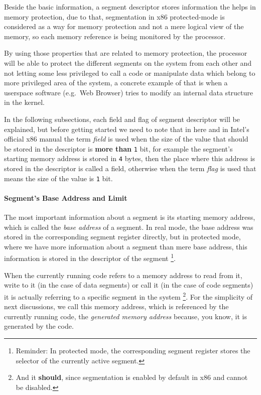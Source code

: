 Beside the basic information, a segment descriptor stores information
the helps in memory protection, due to that, segmentation in x86
protected-mode is considered as a way for memory protection and not a
mere logical view of the memory, so each memory reference is being
monitored by the processor.

By using those properties that are related to memory protection, the
processor will be able to protect the different segments on the system
from each other and not letting some less privileged to call a code or
manipulate data which belong to more privileged area of the system, a
concrete example of that is when a userspace software (e.g.~Web Browser)
tries to modify an internal data structure in the kernel.

In the following subsections, each field and flag of segment descriptor
will be explained, but before getting started we need to note that in
here and in Intel's official x86 manual the term \emph{field} is used
when the size of the value that should be stored in the descriptor is
\textbf{more than} \lstinline!1! bit, for example the segment's starting
memory address is stored in \lstinline!4! bytes, then the place where
this address is stored in the descriptor is called a field, otherwise
when the term \emph{flag} is used that means the size of the value is
\lstinline!1! bit.

\paragraph{Segment's Base Address and
Limit}\label{segments-base-address-and-limit}

The most important information about a segment is its starting memory
address, which is called the \emph{base address} of a segment. In real
mode, the base address was stored in the corresponding segment register
directly, but in protected mode, where we have more information about a
segment than mere base address, this information is stored in the
descriptor of the segment \footnote{Reminder: In protected mode, the
  corresponding segment register stores the selector of the currently
  active segment.}.

When the currently running code refers to a memory address to read from
it, write to it (in the case of data segments) or call it (in the case
of code segments) it is actually referring to a specific segment in the
system \footnote{And it \textbf{should}, since segmentation is enabled
  by default in x86 and cannot be disabled.}. For the simplicity of next
discussions, we call this memory address, which is referenced by the
currently running code, the \emph{generated memory address} because, you
know, it is generated by the code.

